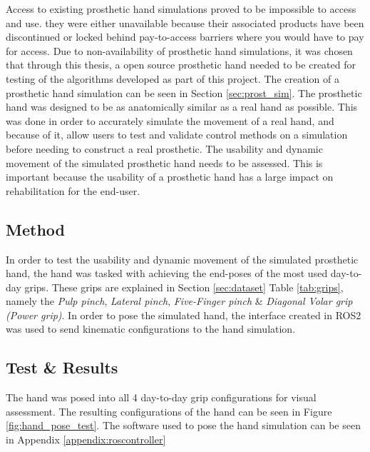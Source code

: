 \documentclass[../main.tex]{subfiles}
\begin{document}
Access to existing prosthetic hand simulations proved to be impossible to access and use.
they were either unavailable because their associated products have been discontinued or locked behind pay-to-access barriers where you would have to pay for access.
Due to non-availability of prosthetic hand simulations, it was chosen that through this thesis, a open source prosthetic hand needed to be created for testing of the algorithms developed as part of this project.
The creation of a prosthetic hand simulation can be seen in Section \ref{sec:prost_sim}.
The prosthetic hand was designed to be as anatomically similar as a real hand as possible.
This was done in order to accurately simulate the movement of a real hand, and because of it, allow users to test and validate control methods on a simulation before needing to construct a real prosthetic.
The usability and dynamic movement of the simulated prosthetic hand needs to be assessed.
This is important because the usability of a prosthetic hand has a large impact on rehabilitation for the end-user.

\subsection{Method}

In order to test the usability and dynamic movement of the simulated prosthetic hand, the hand was tasked with achieving the end-poses of the most used day-to-day grips.
These grips are explained in Section \ref{sec:dataset} Table \ref{tab:grips}, namely the \textit{Pulp pinch}, \textit{Lateral pinch}, \textit{Five-Finger pinch} \& \textit{Diagonal Volar grip (Power grip)}.
In order to pose the simulated hand, the interface created in ROS2 was used to send kinematic configurations to the hand simulation.

\subsection{Test \& Results}

The hand was posed into all 4 day-to-day grip configurations for visual assessment.
The resulting configurations of the hand can be seen in Figure  \ref{fig:hand_pose_test}.
The software used to pose the hand simulation can be seen in Appendix \ref{appendix:roscontroller} 
\end{document}
